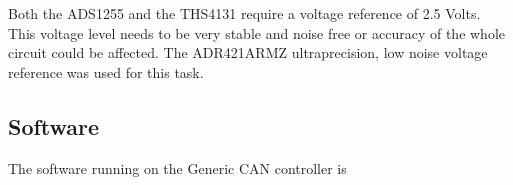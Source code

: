 Both the ADS1255 and the THS4131 require a voltage reference of 2.5 Volts. This voltage level needs to be very stable and noise free or accuracy of the whole circuit could be affected. The ADR421ARMZ ultraprecision, low noise voltage reference was used for this task.


\subsection{Software}
The software running on the Generic CAN controller is 







\newpage